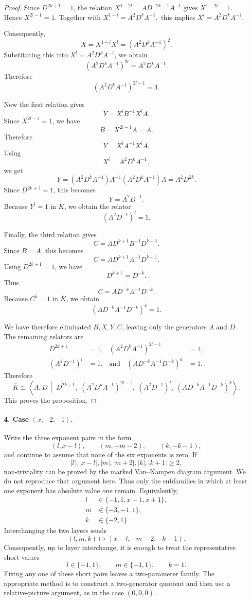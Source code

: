 \documentclass{article}
\begin{document}
\begin{proof}
Since \(D^{2k+1}=1\), the relation
\(
X^{1-2l}=AD^{-2k-1}A^{-1}
\)
gives
\(
X^{1-2l}=1.
\)
Hence
\(
X^{2l-1}=1.
\)
Together with
\(
X^{1-l}=A^2D^kA^{-1},
\)
this implies
\(
X^l=A^2D^kA^{-1}.
\)

Consequently,
\[
X=X^{1-l}X^l
=
\left(A^2D^kA^{-1}\right)^2.
\]
Substituting this into \(X^l=A^2D^kA^{-1}\), we obtain
\[
\left(A^2D^kA^{-1}\right)^{2l}
=
A^2D^kA^{-1}.
\]
Therefore
\[
\left(A^2D^kA^{-1}\right)^{2l-1}=1.
\]

Now the first relation gives
\[
Y=X^lB^{-1}X^lA.
\]
Since \(X^{2l-1}=1\), we have
\[
B=X^{2l-1}A=A.
\]
Therefore
\[
Y=X^lA^{-1}X^lA.
\]
Using
\[
X^l=A^2D^kA^{-1},
\]
we get
\[
Y
=
(A^2D^kA^{-1})A^{-1}(A^2D^kA^{-1})A
=
A^2D^{2k}.
\]
Since \(D^{2k+1}=1\), this becomes
\[
Y=A^2D^{-1}.
\]
Because \(Y^l=1\) in \(\overline K\), we obtain the relator
\[
\left(A^2D^{-1}\right)^l=1.
\]

Finally, the third relation gives
\[
C=AD^{k+1}B^{-1}D^{k+1}.
\]
Since \(B=A\), this becomes
\[
C=AD^{k+1}A^{-1}D^{k+1}.
\]
Using \(D^{2k+1}=1\), we have
\[
D^{k+1}=D^{-k}.
\]
Thus
\[
C=AD^{-k}A^{-1}D^{-k}.
\]
Because \(C^k=1\) in \(\overline K\), we obtain
\[
\left(AD^{-k}A^{-1}D^{-k}\right)^k=1.
\]

We have therefore eliminated \(B,X,Y,C\), leaving only the generators
\(A\) and \(D\). The remaining relators are
\[
\begin{aligned}
D^{2k+1}&=1,&
\left(A^2D^kA^{-1}\right)^{2l-1}&=1,\\
\left(A^2D^{-1}\right)^l&=1,&
\text{and}\quad \left(AD^{-k}A^{-1}D^{-k}\right)^k&=1.
\end{aligned}
\]
Therefore
\[
\overline K
\cong
\left\langle A,D\ \middle|\ 
D^{2k+1},\;
\left(A^2D^kA^{-1}\right)^{2l-1},\;
\left(A^2D^{-1}\right)^l,\;
\left(AD^{-k}A^{-1}D^{-k}\right)^k
\right\rangle .
\]
This proves the proposition.
\end{proof}


\paragraph{4. Case $(x,-2,-1)$.}

Write the three exponent pairs in the form
\[
   (l,x-l),\qquad (m,-m-2),\qquad (k,-k-1),
\]
and continue to assume that none of the six exponents is zero.  If
\[
 |l|,|x-l|,|m|,|m+2|,|k|,|k+1|\geq2,
\]
non-triviality can be proved by the marked Van--Kampen diagram argument.
We do not reproduce that argument here.  Thus only the subfamilies in which
at least one exponent has absolute value one remain.  Equivalently,
\[
\begin{aligned}
 l&\in\{-1,1,x-1,x+1\},\\
 m&\in\{-3,-1,1\},\\
 k&\in\{-2,1\}.
\end{aligned}
\tag{\(*\)}
\]
Interchanging the two layers sends
\[
 (l,m,k)\longmapsto (x-l,-m-2,-k-1).
\]
Consequently, up to layer interchange, it is enough to treat the representative
short values
\[
       l\in\{-1,1\},\qquad m\in\{-1,1\},\qquad k=1.
\]
Fixing any one of these short pairs leaves a two-parameter family.  The
appropriate method is to construct a two-generator quotient and then use a
relative-picture argument, as in the case $(0,0,0)$.
\end{document}
